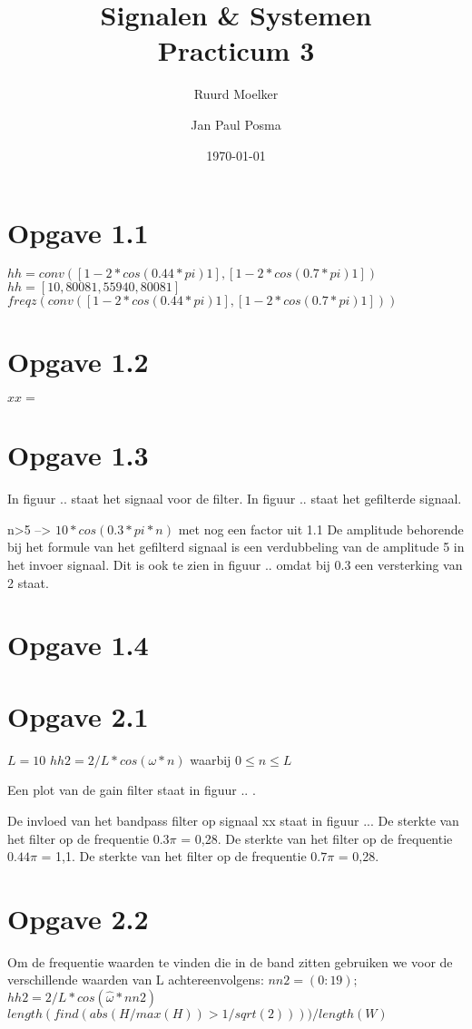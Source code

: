 \documentclass{article}
\author{Ruurd Moelker \and Jan Paul Posma}
\date{\today}
\title{Signalen \& Systemen \\Practicum 3}
\begin{document}
\maketitle
 
\section{Opgave 1.1}
$hh = conv([1 -2*cos(0.44*pi) 1], [1 -2*cos(0.7*pi) 1])$
$hh = [1 0,8008 1,5594 0,8008 1]$
$freqz( conv([1 -2*cos(0.44*pi) 1], [1 -2*cos(0.7*pi) 1]) )$



\section{Opgave 1.2}
$xx = $

\section{Opgave 1.3}
In figuur .. staat het signaal voor de filter. In figuur .. staat het gefilterde signaal.

n>5 --> $10*cos(0.3*pi*n)$ met nog een factor uit 1.1
De amplitude behorende bij het formule van het gefilterd signaal is een verdubbeling van de amplitude 5 in het invoer signaal. Dit is ook te zien in figuur .. omdat bij 0.3 een versterking van 2 staat.

\section{Opgave 1.4}

\section{Opgave 2.1}
$L = 10$
$hh2 = 2/L * cos( \omega*n)$ waarbij $0\leq n \leq L$

Een plot van de gain filter staat in figuur .. .

De invloed van het bandpass filter op signaal xx staat in figuur ...
De sterkte van het filter op de frequentie $0.3\pi$  = 0,28.
De sterkte van het filter op de frequentie $0.44\pi$  = 1,1.
De sterkte van het filter op de frequentie $0.7\pi$  = 0,28.

\section{Opgave 2.2}

Om de frequentie waarden te vinden die in de band zitten gebruiken we voor de verschillende waarden van L achtereenvolgens:
$nn2 = (0:19);$
$hh2 = 2/L* cos( \hat{\omega}*nn2)$
$length(find(abs(H/max(H)) > 1/sqrt(2)))) / length(W)$
\end{document}
